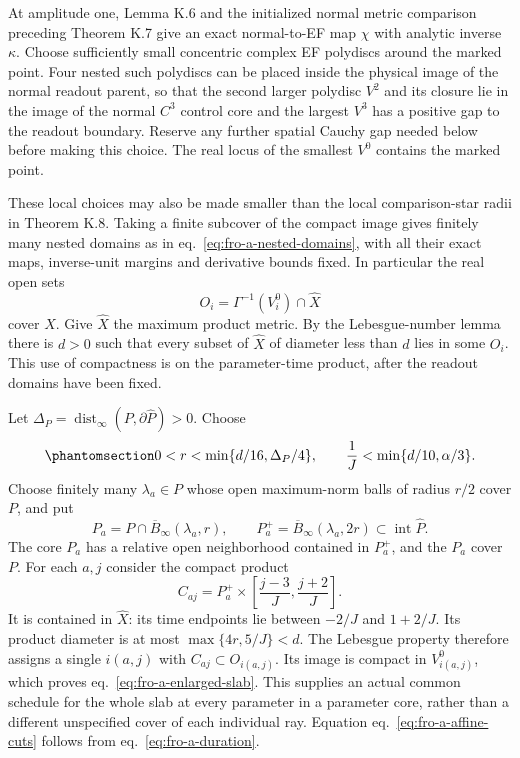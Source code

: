 \documentclass[
  english,
  11pt,
  reqno]{amsart}
\begin{document}
At amplitude one, Lemma K.6 and the initialized normal metric comparison
preceding Theorem K.7 give an exact normal-to-EF map \(\chi\) with
analytic inverse \(\kappa\). Choose sufficiently small concentric
complex EF polydiscs around the marked point. Four nested such polydiscs
can be placed inside the physical image of the normal readout parent, so
that the second larger polydisc \(V^2\) and its closure lie in the image
of the normal \(C^3\) control core and the largest \(V^3\) has a
positive gap to the readout boundary. Reserve any further spatial Cauchy
gap needed below before making this choice. The real locus of the
smallest \(V^0\) contains the marked point.

These local choices may also be made smaller than the local
comparison-star radii in Theorem K.8. Taking a finite subcover of the
compact image gives finitely many nested domains as in
eq.~\ref{eq:fro-a-nested-domains}, with all their exact maps,
inverse-unit margins and derivative bounds fixed. In particular the real
open sets \[
 O_i=\Gamma^{-1}(V_i^0)\cap\widehat X
\] cover \(\widehat X\). Give \(\widehat X\) the maximum product metric.
By the Lebesgue-number lemma there is \(d>0\) such that every subset of
\(\widehat X\) of diameter less than \(d\) lies in some \(O_i\). This
use of compactness is on the parameter-time product, after the readout
domains have been fixed.

Let \(\Delta_P=\operatorname{dist}_\infty(P,\partial\widehat P)>0\).
Choose
\begin{equation}\protect\phantomsection\label{eq:fro-a-product-mesh}{
 0<r<\min\{d/16,\Delta_P/4\},
 \qquad
 \frac1J<\min\{d/10,\alpha/3\}.
}\end{equation} Choose finitely many \(\lambda_a\in P\) whose open
maximum-norm balls of radius \(r/2\) cover \(P\), and put \[
 P_a=P\cap\overline B_\infty(\lambda_a,r),\qquad
 P_a^+=\overline B_\infty(\lambda_a,2r)
                              \subset\operatorname{int}\widehat P.
\] The core \(P_a\) has a relative open neighborhood contained in
\(P_a^+\), and the \(P_a\) cover \(P\). For each \(a,j\) consider the
compact product \[
 C_{aj}=P_a^+\times
          \left[\frac{j-3}{J},\frac{j+2}{J}\right].
\] It is contained in \(\widehat X\): its time endpoints lie between
\(-2/J\) and \(1+2/J\). Its product diameter is at most
\(\max\{4r,5/J\}<d\). The Lebesgue property therefore assigns a single
\(i(a,j)\) with \(C_{aj}\subset O_{i(a,j)}\). Its image is compact in
\(V_{i(a,j)}^0\), which proves eq.~\ref{eq:fro-a-enlarged-slab}. This
supplies an actual common schedule for the whole slab at every parameter
in a parameter core, rather than a different unspecified cover of each
individual ray. Equation eq.~\ref{eq:fro-a-affine-cuts} follows from
eq.~\ref{eq:fro-a-duration}.
\end{document}
